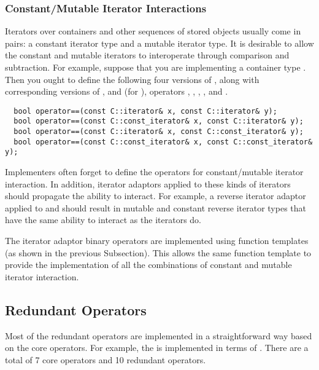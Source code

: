 \documentclass{netobjectdays}
\begin{document}
\subsubsection{Constant/Mutable Iterator Interactions}
\label{sec:constant-mutable-iterations}

Iterators over containers and other sequences of stored objects
usually come in pairs: a constant iterator type and a mutable iterator
type. It is desirable to allow the constant and mutable iterators to
interoperate through comparison and subtraction. For example, suppose
that you are implementing a container type . Then you ought to
define the following four versions of , along with
corresponding versions of , and (for
), operators \code{<}, \code{>},
\code{<=}, \code{>=}, and \code{-}.

{\footnotesize
\begin{verbatim}
  bool operator==(const C::iterator& x, const C::iterator& y);
  bool operator==(const C::const_iterator& x, const C::iterator& y);
  bool operator==(const C::iterator& x, const C::const_iterator& y);
  bool operator==(const C::const_iterator& x, const C::const_iterator& y);
\end{verbatim}
}

Implementers often forget to define the operators for constant/mutable
iterator interaction. In addition, iterator adaptors applied to these
kinds of iterators should propagate the ability to interact. For
example, a reverse iterator adaptor applied to  and
 should result in mutable and constant
reverse iterator types that have the same ability to interact as the
 iterators do.

The iterator adaptor binary operators are implemented using function
templates (as shown in the previous Subsection). This allows the same
function template to provide the implementation of all the
combinations of constant and mutable iterator interaction.


\subsection{Redundant Operators}

Most of the redundant operators are implemented in a straightforward
way based on the core operators. For example, the  is
implemented in terms of . There are a total of 7 core
operators and 10 redundant operators.
\end{document}
